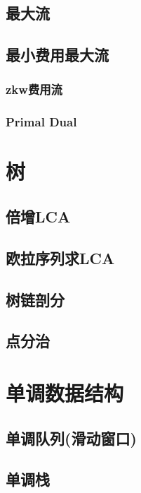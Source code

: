 \documentclass{article}
\begin{document}
		\subsection{最大流}
			

		\subsection{最小费用最大流}
			\subsubsection{zkw费用流}
			
			\subsubsection{Primal Dual}
			
	\newpage

	\section{树}
		\subsection{倍增LCA}
		
		\subsection{欧拉序列求LCA}
		
		\subsection{树链剖分}
		
		\subsection{点分治}

	\newpage

	\section{单调数据结构}
		\subsection{单调队列(滑动窗口)}
		
		\subsection{单调栈}
\end{document}

